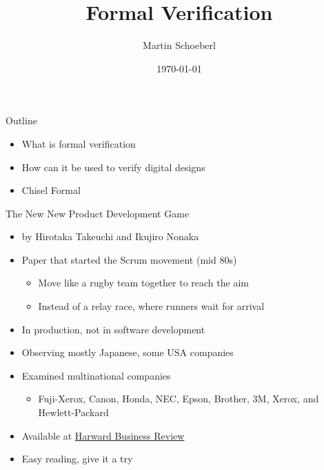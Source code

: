 

\newif\ifbook


\usepackage{tikz}
\usetikzlibrary{positioning, arrows.meta}


\title{Formal Verification}
\author{Martin Schoeberl}
\date{\today}



\begin{frame}
\titlepage
\end{frame}




\begin{frame}[fragile]{Outline}
\begin{itemize}

\item What is formal verification
\item How can it be used to verify digital designs
\item Chisel Formal

\end{itemize}
\end{frame}

\begin{frame}[fragile]{The New New Product Development Game}
\begin{itemize}
\item by Hirotaka Takeuchi and Ikujiro Nonaka
\item Paper that started the Scrum movement (mid 80s)
\begin{itemize}
\item Move like a rugby team together to reach the aim
\item Instead of a relay race, where runners wait for arrival
\end{itemize}
\item In production, not in software development
\item Observing mostly Japanese, some USA companies
\item Examined multinational companies
\begin{itemize}
\item Fuji-Xerox, Canon, Honda, NEC, Epson, Brother, 3M, Xerox, and Hewlett-Packard
\end{itemize}
\item Available at \href{https://hbr.org/1986/01/the-new-new-product-development-game}{Harward Business Review}
\item Easy reading, give it a try
\end{itemize}
\end{frame}

